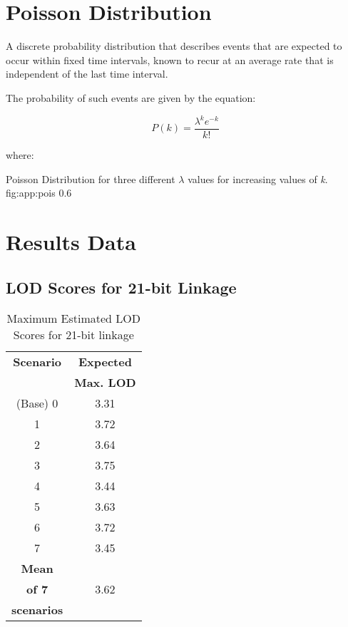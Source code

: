 \section{Poisson Distribution}\label{ref:app:poisson}

A discrete probability distribution that describes events that are expected to occur within fixed time intervals, known to recur at an average rate that is independent of the last time interval.

The probability of such events are given by the equation:

\begin{equation}
P(k) = \frac{\lambda^k e^{-k}}{k!}
\end{equation}

\begin{spacing}{1}
where:
\begin{description}
\end{description}
\end{spacing}


{Poisson Distribution for three different $\lambda$ values for increasing values of \textit{k}.}
{fig:app:pois}
{0.6}
{}








\section{Results Data}

\subsection{LOD Scores for 21-bit Linkage}
\label{ref:app:21bitscores}

\begin{table}[h!]
\begin{center}
\begin{tabular}{|c|c|}\hline
\textbf{Scenario} & \textbf{Expected} \\
         & \textbf{Max. LOD}  \\\hline
(Base) 0 &  3.31 \\
1 & 3.72 \\
2 & 3.64 \\
3 & 3.75 \\
4 & 3.44 \\
5 & 3.63 \\
6 & 3.72 \\
7 & 3.45 \\\hline
\textbf{Mean} &      \\
\textbf{of 7} & 3.62 \\
\textbf{scenarios} & \\\hline
\end{tabular}
\end{center}
\caption{Maximum Estimated LOD Scores for 21-bit linkage}
\end{table}


